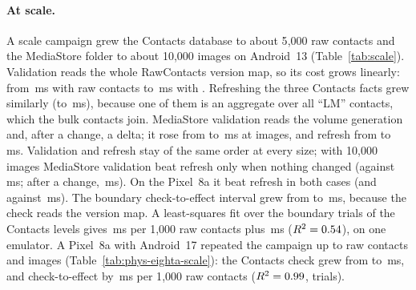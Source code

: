 


\paragraph{At scale.} A scale campaign grew the Contacts database to about 5{,}000 raw contacts and the MediaStore folder to about 10{,}000 images on Android~13 (Table~\ref{tab:scale}). Validation reads the whole RawContacts version map, so its cost grows linearly: from \ScaleContactsZeroVc\,ms with \ScaleContactsZeroRaw raw contacts to \ScaleContactsFivezerozerozeroVc\,ms with \ScaleContactsFivezerozerozeroRaw. Refreshing the three Contacts facts grew similarly (\ScaleContactsZeroRc to \ScaleContactsFivezerozerozeroRc\,ms), because one of them is an aggregate over all ``LM'' contacts, which the bulk contacts join. MediaStore validation reads the volume generation and, after a change, a delta; it rose from \ScaleContactsZeroVm to \ScaleMediaOnezerozerozerozeroVm\,ms at \ScaleMediaOnezerozerozerozeroImg images, and refresh from \ScaleContactsZeroRm to \ScaleMediaOnezerozerozerozeroRm\,ms. Validation and refresh stay of the same order at every size; with 10{,}000 images MediaStore validation beat refresh only when nothing changed (\ScaleMediaOnezerozerozerozeroVm against \ScaleMediaOnezerozerozerozeroRm\,ms; after a change, \ScaleMediaOnezerozerozerozeroVmc\,ms). On the Pixel~8a it beat refresh in both cases (\PhysEightAScaleMediaTenKVm and \PhysEightAScaleMediaTenKVmc against \PhysEightAScaleMediaTenKRm\,ms). The boundary check-to-effect interval grew from \ScaleContactsZeroCte to \ScaleContactsFivezerozerozeroCte\,ms, because the check reads the version map. A least-squares fit over the \ScaleCteN boundary trials of the Contacts levels gives \ScaleCteSlope\,ms per 1{,}000 raw contacts plus \ScaleCteIntercept\,ms ($R^2=0.54$), on one emulator. A Pixel~8a with Android~17 repeated the campaign up to \PhysEightAScaleTenKRaw raw contacts and \PhysEightAScaleMediaTenKImg images (Table~\ref{tab:phys-eighta-scale}): the Contacts check grew from \PhysEightAScaleZeroVc to \PhysEightAScaleTenKVc\,ms, and check-to-effect by \PhysEightAScaleCteSlope\,ms per 1{,}000 raw contacts ($R^2=0.99$, \PhysEightAScaleCteN trials).


